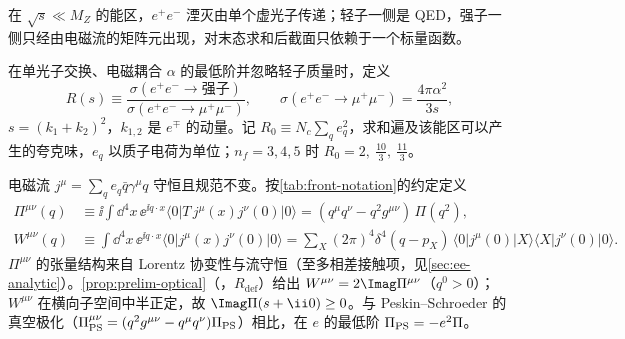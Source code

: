 在 $\sqrt s\ll M_Z$ 的能区，$e^+e^-$ 湮灭由单个虚光子传递；轻子一侧是 QED，强子一侧只经由电磁流的矩阵元出现，对末态求和后截面只依赖于一个标量函数。

\begin{definition}[$R$ 比]\label{def:ee-R}
在单光子交换、电磁耦合 $\alpha$ 的最低阶并忽略轻子质量时，定义
\begin{equation}\label{eq:ee-Rdef}
R(s)\equiv\frac{\sigma(e^+e^-\to\text{强子})}{\sigma(e^+e^-\to\mu^+\mu^-)},\qquad
\sigma(e^+e^-\to\mu^+\mu^-)=\frac{4\pi\alpha^2}{3s},
\end{equation}
$s=(k_1+k_2)^2$，$k_{1,2}$ 是 $e^\mp$ 的动量。记 $R_0\equiv N_c\sum_qe_q^2$，求和遍及该能区可以产生的夸克味，$e_q$ 以质子电荷为单位；$n_f=3,4,5$ 时 $R_0=2,\ \frac{10}3,\ \frac{11}3$。%
\end{definition}

电磁流 $j^\mu=\sum_qe_q\bar q\gamma^\mu q$ 守恒且规范不变。按\cref{tab:front-notation}的约定定义%
\begin{align}
\Pi^{\mu\nu}(q)&\equiv\ii\!\int\!\dd^4x\,\ee^{\ii q\cdot x}\langle0|T\,j^\mu(x)j^\nu(0)|0\rangle=(q^\mu q^\nu-q^2g^{\mu\nu})\,\Pi(q^2), \label{eq:ee-Pidef}\\
W^{\mu\nu}(q)&\equiv\int\!\dd^4x\,\ee^{\ii q\cdot x}\langle0|j^\mu(x)j^\nu(0)|0\rangle
=\sum_X(2\pi)^4\delta^4(q-p_X)\,\langle0|j^\mu(0)|X\rangle\langle X|j^\nu(0)|0\rangle . \label{eq:ee-Wdef}
\end{align}
$\Pi^{\mu\nu}$ 的张量结构来自 Lorentz 协变性与流守恒（至多相差接触项，见\allowbreak\cref{sec:ee-analytic}）。\cref{prop:prelim-optical}（\tagR，$R_{\mathrm{def}}$）给出 $W^{\mu\nu}=2\Imag\Pi^{\mu\nu}$（$q^0>0$）；$W^{\mu\nu}$ 在横向子空间中半正定，故 $\Imag\Pi(s+\ii0)\ge0$。与 Peskin--Schroeder 的真空极化（$\Pi^{\mu\nu}_{\rm PS}=(q^2g^{\mu\nu}-q^\mu q^\nu)\Pi_{\rm PS}$）相比，在 $e$ 的最低阶 $\Pi_{\rm PS}=-e^2\Pi$。

